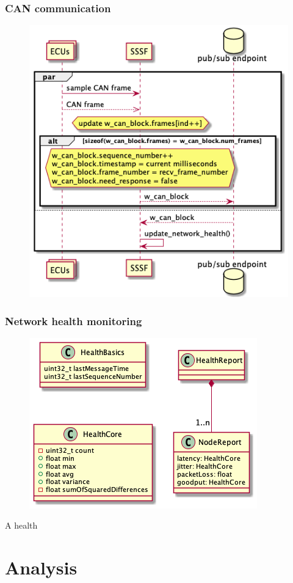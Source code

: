 \documentclass[letterpaper,twocolumn,12pt]{article}
\begin{document}
\subsubsection{CAN communication}
\begin{figure}[t!]
    \centering
    \includegraphics[width=\linewidth]{out/images/can_exchange/can_exchange.png}
    \caption{}
    \label{fig:}
\end{figure}
\subsubsection{Network health monitoring}
\begin{figure}[t!]
    \centering
    \includegraphics[width=\linewidth]{out/images/network_health/network_health.png}
    \caption{}
    \label{fig:}
\end{figure}
A health 

\section{Analysis}





\end{document}
